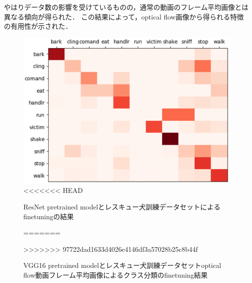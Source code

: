 やはりデータ数の影響を受けているものの，通常の動画のフレーム平均画像とは異なる傾向が得られた．
この結果によって，optical flow画像から得られる特徴の有用性が示された．
\begin{figure}[htbp]
  \begin{center}
    \includegraphics[scale=0.5]{./Figures/resque_optmean_result.eps}
<<<<<<< HEAD
    \caption{ResNet pretrained modelとレスキュー犬訓練データセットによるfinetuningの結果}
=======
    \caption{VGG16 pretrained modelとレスキュー犬訓練データセットoptical flow動画フレーム平均画像によるクラス分類のfinetuning結果}
>>>>>>> 97722dad1633d4026e4146df3a57028b25c8b44f
    \label{sub_optresque_res}
  \end{center}
\end{figure}
